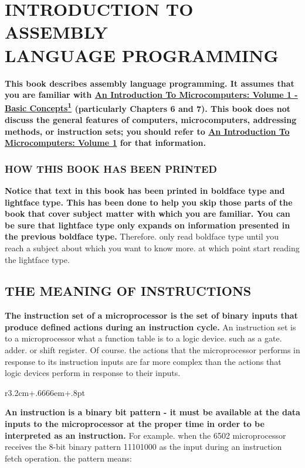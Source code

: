 \documentclass{book}
\begin{document}
\chapter{INTRODUCTION TO ASSEMBLY\\ LANGUAGE PROGRAMMING}

\textbf{This book describes assembly language programming. It assumes that you are familiar with \underline{An Introduction To Microcomputers: Volume 1 - Basic Concepts\textsuperscript{1}} (particularly Chapters 6 and 7). This book does not discuss the general features of computers, microcomputers, addressing methods, or instruction sets; you should refer to \underline{An Introduction To Microcomputers: Volume 1} for that information.}

\subsection*{HOW THIS BOOK HAS BEEN PRINTED}

\textbf{Notice that text in this book has been printed in boldface type and lightface type. This has been done to help you skip those parts of the book that cover subject matter with which you are familiar. You can be sure that lightface type only expands on information presented in the previous boldface type.} Therefore. only read boldface type until you reach a subject about which you want to know more. at which point start reading the lightface type.

\section*{THE MEANING OF INSTRUCTIONS}

\textbf{The instruction set of a microprocessor is the set of binary inputs that produce defined actions during an instruction cycle.} An instruction set is to a microprocessor what a function table is to a logic device. such as a gate. adder. or shift register. Of course. the actions that the microprocessor performs in response to its instruction inputs are far more complex than the actions that logic devices perform in response to their inputs.\\
\begin{wrapfigure}{r}{3.2cm+.6666em+.8pt}
\end{wrapfigure}
\textbf{An instruction is a binary bit pattern - it must be available at the data inputs to the microprocessor at the proper time in order to be interpreted as an instruction.} For example. when the 6502 microprocessor receives the 8-bit binary pattern 11101000 as the input during an instruction fetch operation. the pattern means:\\
\end{document}
